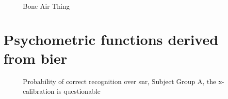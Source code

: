 \begin{figure}[H]
\centering

\caption{Bone Air Thing}
\label{fig:srt_normal}
\end{figure}

\section{Psychometric functions derived from \gls{bier}}



\begin{figure}[H]
\centering

\caption{Probability of correct recognition over \gls{snr}, Subject Group A, the x-calibration is questionable}
\label{fig:group_A_decomp}
\end{figure}



